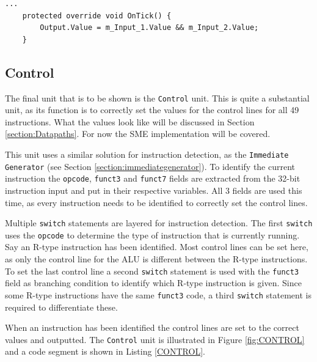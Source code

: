        \begin{minipage}{\linewidth}
            \begin{lstlisting}[language={[Sharp]C}, caption={A slice of the \texttt{AND gate} process SME code. It simply calculates the logical AND of two input and outputs the result.},captionpos=b, label = AND]
...
    protected override void OnTick() {
        Output.Value = m_Input_1.Value && m_Input_2.Value;
    }
            \end{lstlisting}
        \end{minipage} 
        
    \subsection{Control}
        The final unit that is to be shown is the \texttt{Control} unit. This is quite a substantial unit, as its function is to correctly set the values for the control lines for all 49 instructions. What the values look like will be discussed in Section \ref{section:Datapaths}. For now the SME implementation will be covered.
        
        This unit uses a similar solution for instruction detection, as the \texttt{Immediate Generator} (see Section \ref{section:immediategenerator}). To identify the current instruction the \texttt{opcode}, \texttt{funct3} and \texttt{funct7} fields are extracted from the 32-bit instruction input and put in their respective variables. All 3 fields are used this time, as every instruction needs to be identified to correctly set the control lines.
        
        Multiple \texttt{switch} statements are layered for instruction detection. The first \texttt{switch} uses the \texttt{opcode} to determine the type of instruction that is currently running. Say an R-type instruction has been identified. Most control lines can be set here, as only the control line for the ALU is different between the R-type instructions. To set the last control line a second \texttt{switch} statement is used with the \texttt{funct3} field as branching condition to identify which R-type instruction is given. Since some R-type instructions have the same \texttt{funct3} code, a third \texttt{switch} statement is required to differentiate these.
        
        When an instruction has been identified the control lines are set to the correct values and outputted. The \texttt{Control} unit is illustrated in Figure \ref{fig:CONTROL} and a code segment is shown in Listing \ref{CONTROL}.
        
